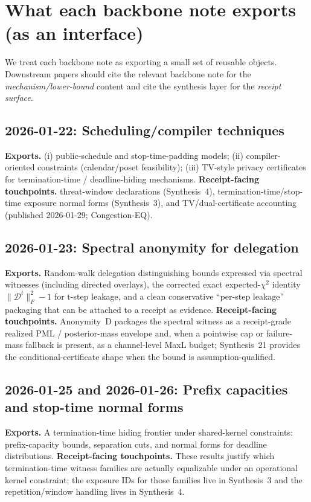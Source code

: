 \documentclass[11pt]{article}
\begin{document}
\section{What each backbone note exports (as an interface)}
We treat each backbone note as exporting a small set of reusable objects.
Downstream papers should cite the relevant backbone note for the 
\emph{mechanism/lower-bound} content and cite the synthesis layer for the \emph{receipt surface}.

\subsection{2026-01-22: Scheduling/compiler techniques}
\textbf{Exports.}
(i) public-schedule and stop-time-padding models; (ii) compiler-oriented constraints (calendar/poset feasibility); (iii) TV-style privacy certificates for termination-time / deadline-hiding mechanisms.
\textbf{Receipt-facing touchpoints.} threat-window declarations (Synthesis~4), termination-time/stop-time exposure normal forms (Synthesis~3), and TV/dual-certificate accounting (published 2026-01-29; Congestion-EQ).\cite{series:threatwindows,series:traceifaces,wiki:knapsack}

\subsection{2026-01-23: Spectral anonymity for delegation}
\textbf{Exports.}
Random-walk delegation distinguishing bounds expressed via spectral witnesses (including directed overlays), the corrected exact expected-$\chi^2$ identity $\|\mathcal D^t\|_F^2-1$ for t-step leakage, and a clean conservative ``per-step leakage'' packaging that can be attached to a receipt as evidence.
\textbf{Receipt-facing touchpoints.} Anonymity~D packages the spectral witness as a receipt-grade realized PML / posterior-mass envelope and, when a pointwise cap or failure-mass fallback is present, as a channel-level MaxL budget; Synthesis~21 provides the conditional-certificate shape when the bound is assumption-qualified.\cite{series:spectral2budget,series:condcert}

\subsection{2026-01-25 and 2026-01-26: Prefix capacities and stop-time normal forms}
\textbf{Exports.}
A termination-time hiding frontier under shared-kernel constraints: prefix-capacity bounds, separation cuts, and normal forms for deadline distributions.
\textbf{Receipt-facing touchpoints.} These results justify which termination-time witness families are actually equalizable under an operational kernel constraint; the exposure IDs for those families live in Synthesis~3 and the repetition/window handling lives in Synthesis~4.\cite{series:traceifaces,series:threatwindows}
\end{document}

